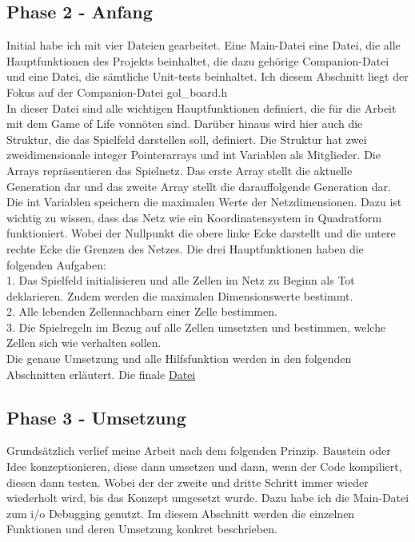 \documentclass[11pt]{scrartcl}
\begin{document}
\subsection{Phase 2 - Anfang}
Initial habe ich mit vier Dateien gearbeitet. Eine Main-Datei eine Datei, die alle Hauptfunktionen des Projekts beinhaltet, die dazu gehörige Companion-Datei und eine Datei, die sämtliche Unit-tests beinhaltet.
Ich diesem Abschnitt liegt der Fokus auf der Companion-Datei gol\_board.h\\
In dieser Datei sind alle wichtigen Hauptfunktionen definiert, die für die Arbeit mit dem Game of Life vonnöten sind. Darüber hinaus wird hier auch die Struktur, die das Spielfeld darstellen soll, definiert. Die Struktur hat zwei zweidimensionale integer Pointerarrays und int Variablen als Mitglieder. Die Arrays repräsentieren das Spielnetz.  Das erste Array stellt die aktuelle Generation dar und das zweite Array stellt die darauffolgende Generation dar. Die int Variablen speichern die maximalen Werte der Netzdimensionen. Dazu ist wichtig zu wissen, dass das Netz wie ein Koordinatensystem in Quadratform funktioniert. Wobei der Nullpunkt die obere linke Ecke darstellt und die untere rechte Ecke die Grenzen des Netzes.
Die drei Hauptfunktionen haben die folgenden Aufgaben:\\
1. Das Spielfeld initialisieren und alle Zellen im Netz zu Beginn als Tot deklarieren. Zudem werden die maximalen Dimensionswerte bestimmt.\\
2. Alle lebenden Zellennachbarn einer Zelle bestimmen.\\
3. Die Spielregeln im Bezug auf alle Zellen umsetzten und bestimmen, welche Zellen sich wie verhalten sollen.\\
Die genaue Umsetzung und alle Hilfsfunktion werden in den folgenden Abschnitten erläutert. Die finale \href{https://gitlab.rz.htw-berlin.de/Lennard.Wittenberg/c-project-wise-lennard-wittenberg/-/blob/main/gol_board.h}{Datei}  
\subsection{Phase 3 - Umsetzung}
Grundsätzlich verlief meine Arbeit nach dem folgenden Prinzip. Baustein oder Idee konzeptionieren, diese dann umsetzen und dann, wenn der Code kompiliert, diesen dann testen. Wobei der der zweite und dritte Schritt immer wieder wiederholt wird, bis das Konzept umgesetzt wurde.
Dazu habe ich die Main-Datei zum i/o Debugging genutzt. Im diesem Abschnitt werden die einzelnen Funktionen und deren Umsetzung konkret beschrieben.
\end{document}
